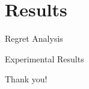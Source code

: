 \documentclass[10pt, xcolor=x11names,compress]{beamer}
\begin{document}
\section{Results}
\begin{frame}{Regret Analysis}

\end{frame}

\begin{frame}{Experimental Results}

\end{frame}

\begin{frame}
 \begin{center}
		{\Huge Thank you!}\\
		
	\end{center}
\end{frame}
\end{document}
